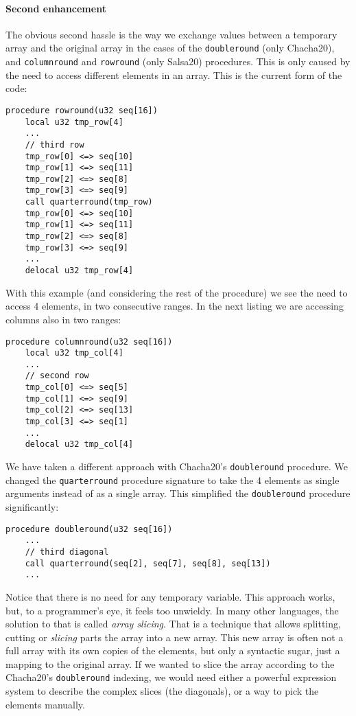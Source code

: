 \documentclass[a4paper,10pt,openright]{memoir}
\newcommand{\term}[1]{\textit{#1}}
\newcommand{\code}[1]{\texttt{#1}}
\begin{document}
\paragraph{Second enhancement}

The obvious second hassle is the way we exchange values between 
a temporary array and the original array in the cases of the 
\code{doubleround} (only Chacha20), and \code{columnround} and 
\code{rowround} (only Salsa20) procedures. This is only caused by the 
need to access different elements in an array. This is the current form 
of the code:

\begin{lstlisting}[language=Janus]
procedure rowround(u32 seq[16])
	local u32 tmp_row[4]
	...
	// third row
	tmp_row[0] <=> seq[10]
	tmp_row[1] <=> seq[11]
	tmp_row[2] <=> seq[8]
	tmp_row[3] <=> seq[9]
	call quarterround(tmp_row)
	tmp_row[0] <=> seq[10]
	tmp_row[1] <=> seq[11]
	tmp_row[2] <=> seq[8]
	tmp_row[3] <=> seq[9]
	...
	delocal u32 tmp_row[4]
\end{lstlisting}

With this example (and considering the rest of the procedure) we see 
the need to access 4 elements, in two consecutive ranges. In the next 
listing we are accessing columns also in two ranges:

\begin{lstlisting}[language=Janus]
procedure columnround(u32 seq[16])
	local u32 tmp_col[4]
	...
	// second row
	tmp_col[0] <=> seq[5]
	tmp_col[1] <=> seq[9]
	tmp_col[2] <=> seq[13]
	tmp_col[3] <=> seq[1]
	...
	delocal u32 tmp_col[4]
\end{lstlisting}

We have taken a different approach with Chacha20's \code{doubleround} 
procedure. We changed the \code{quarterround} procedure signature to 
take the 4 elements as single arguments instead of as a single array. 
This simplified the \code{doubleround} procedure significantly:

\begin{lstlisting}[language=Janus]
procedure doubleround(u32 seq[16])
	...
	// third diagonal
	call quarterround(seq[2], seq[7], seq[8], seq[13])
	...
\end{lstlisting}

Notice that there is no need for any temporary variable. This approach 
works, but, to a programmer's eye, it feels too unwieldy. In many other 
languages, the solution to that is called \term{array slicing}. That is 
a technique that allows splitting, cutting or \term{slicing} parts the 
array into a new array. This new array is often not a full array with 
its own copies of the elements, but only a syntactic sugar, just a 
mapping to the original array. If we wanted to slice the array 
according to the Chacha20's \code{doubleround} indexing, we would need 
either a powerful expression system to describe the complex slices (the 
diagonals), or a way to pick the elements manually.
\end{document}
